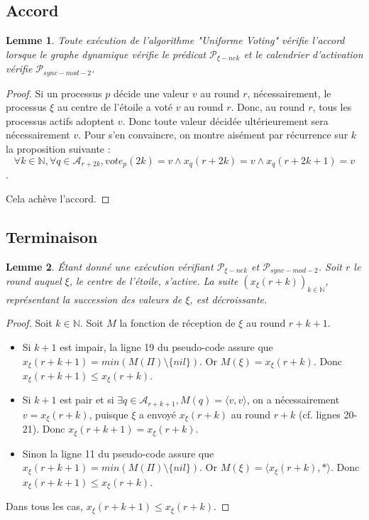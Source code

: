\documentclass{article}
\newtheorem{lemma}{Lemme}
\begin{document}
\subsection{Accord}

\begin{lemma}
	Toute exécution de l'algorithme "Uniforme Voting" vérifie l'accord lorsque le graphe dynamique vérifie le prédicat $\mathcal{P}_{\xi-nek}$
	et le calendrier d'activation vérifie $\mathcal{P}_{sync-mod-2}$.
\end{lemma}
\begin{proof}
	Si un processus $p$ décide une valeur $v$ au round $r$, nécessairement, le processus $\xi$ au centre de l'étoile a voté $v$ au round $r$.
	Donc, au round $r$, tous les processus actifs adoptent $v$.
	Donc toute valeur décidée ultérieurement sera nécessairement $v$. Pour s'en convaincre, on montre aisément par récurrence sur $k$ la proposition suivante :
	$$\forall k \in \mathds{N}, \forall q \in \mathcal{A}_{r+2k}, vote_p(2k) = v \wedge x_q(r+2k) = v \wedge x_q(r+2k+1) = v$$.

	Cela achève l'accord.
\end{proof}

\subsection{Terminaison}

	\begin{lemma}
		Étant donné une exécution vérifiant $\mathcal{P}_{\xi-nek}$ et $\mathcal{P}_{sync-mod-2}$.
		Soit $r$ le round auquel $\xi$, le centre de l'étoile, s'active.
		La suite $(x_\xi(r+k))_{k \in \mathds{N}}$, représentant la succession des valeurs de $\xi$, est décroissante.
	\end{lemma}
	\begin{proof}
		Soit $k \in \mathds{N}$. Soit $M$ la fonction de réception de $\xi$ au round $r+k+1$.
		\begin{itemize}

			\item Si $k+1$ est impair, la ligne 19 du pseudo-code assure que $x_\xi(r+k+1) = min(M(\Pi) \setminus \{nil\})$.
				Or $M(\xi) = x_\xi(r+k)$.  Donc $x_\xi(r+k+1) \leq x_\xi(r+k)$.
			\item Si $k+1$ est pair et si $\exists q \in \mathcal{A}_{r+k+1}, M(q) = \langle v, v \rangle$,
				on a nécessairement $v = x_\xi(r+k)$, puisque $\xi$ a envoyé $x_\xi(r+k)$ au round $r+k$ (cf. lignes 20-21).
				Donc $x_\xi(r+k+1) = x_\xi(r+k)$.
			\item Sinon la ligne 11 du pseudo-code assure que $x_\xi(r+k+1) = min(M(\Pi) \setminus \{nil\})$.
				Or $M(\xi) = \langle x_\xi(r+k), * \rangle$.
				Donc $x_\xi(r+k+1) \leq x_\xi(r+k)$.

		\end{itemize}
		Dans tous les cas, $x_\xi(r+k+1) \leq x_\xi(r+k)$.
	\end{proof}
		
\end{document}
